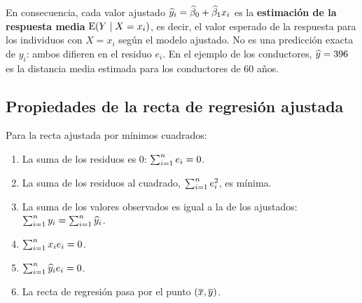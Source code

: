 En consecuencia, cada valor ajustado $\widehat{y}_i=\widehat{\beta}_0+\widehat{\beta}_1x_i$ es la
\textbf{estimación de la respuesta media} $\operatorname{E}(Y\mid X=x_i)$, es decir, el valor esperado de la
respuesta para los individuos con $X=x_i$ según el modelo ajustado. No es una predicción exacta
de $y_i$: ambos difieren en el residuo $e_i$. En el ejemplo de los conductores,
$\widehat{y}=396$ es la distancia media estimada para los conductores de 60 años.

\subsection{Propiedades de la recta de regresión ajustada}

\begin{proposicion}
  Para la recta ajustada por mínimos cuadrados:
  \begin{enumerate}
    \item La suma de los residuos es 0: $\sum_{i=1}^{n} e_i=0$.
    \item La suma de los residuos al cuadrado, $\sum_{i=1}^{n} e_i^2$, es mínima.
    \item La suma de los valores observados es igual a la de los ajustados:
      $\sum_{i=1}^{n} y_i=\sum_{i=1}^{n} \widehat{y}_i$.
    \item $\sum_{i=1}^{n} x_ie_i=0$.
    \item $\sum_{i=1}^{n} \widehat{y}_ie_i=0$.
    \item La recta de regresión pasa por el punto $(\overline{x},\overline{y})$.
  \end{enumerate}
\end{proposicion}

